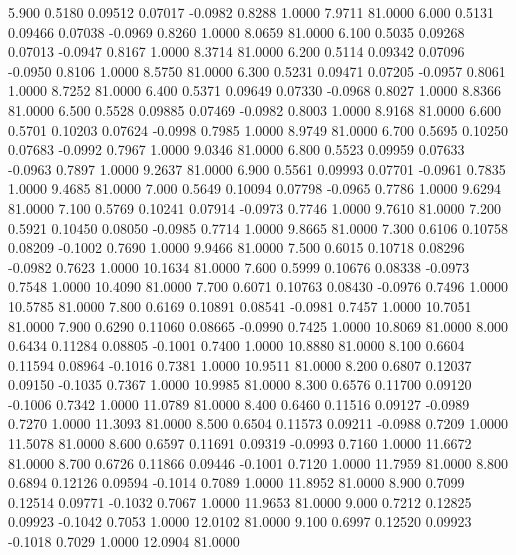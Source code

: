    5.900   0.5180   0.09512   0.07017  -0.0982   0.8288   1.0000   7.9711  81.0000
   6.000   0.5131   0.09466   0.07038  -0.0969   0.8260   1.0000   8.0659  81.0000
   6.100   0.5035   0.09268   0.07013  -0.0947   0.8167   1.0000   8.3714  81.0000
   6.200   0.5114   0.09342   0.07096  -0.0950   0.8106   1.0000   8.5750  81.0000
   6.300   0.5231   0.09471   0.07205  -0.0957   0.8061   1.0000   8.7252  81.0000
   6.400   0.5371   0.09649   0.07330  -0.0968   0.8027   1.0000   8.8366  81.0000
   6.500   0.5528   0.09885   0.07469  -0.0982   0.8003   1.0000   8.9168  81.0000
   6.600   0.5701   0.10203   0.07624  -0.0998   0.7985   1.0000   8.9749  81.0000
   6.700   0.5695   0.10250   0.07683  -0.0992   0.7967   1.0000   9.0346  81.0000
   6.800   0.5523   0.09959   0.07633  -0.0963   0.7897   1.0000   9.2637  81.0000
   6.900   0.5561   0.09993   0.07701  -0.0961   0.7835   1.0000   9.4685  81.0000
   7.000   0.5649   0.10094   0.07798  -0.0965   0.7786   1.0000   9.6294  81.0000
   7.100   0.5769   0.10241   0.07914  -0.0973   0.7746   1.0000   9.7610  81.0000
   7.200   0.5921   0.10450   0.08050  -0.0985   0.7714   1.0000   9.8665  81.0000
   7.300   0.6106   0.10758   0.08209  -0.1002   0.7690   1.0000   9.9466  81.0000
   7.500   0.6015   0.10718   0.08296  -0.0982   0.7623   1.0000  10.1634  81.0000
   7.600   0.5999   0.10676   0.08338  -0.0973   0.7548   1.0000  10.4090  81.0000
   7.700   0.6071   0.10763   0.08430  -0.0976   0.7496   1.0000  10.5785  81.0000
   7.800   0.6169   0.10891   0.08541  -0.0981   0.7457   1.0000  10.7051  81.0000
   7.900   0.6290   0.11060   0.08665  -0.0990   0.7425   1.0000  10.8069  81.0000
   8.000   0.6434   0.11284   0.08805  -0.1001   0.7400   1.0000  10.8880  81.0000
   8.100   0.6604   0.11594   0.08964  -0.1016   0.7381   1.0000  10.9511  81.0000
   8.200   0.6807   0.12037   0.09150  -0.1035   0.7367   1.0000  10.9985  81.0000
   8.300   0.6576   0.11700   0.09120  -0.1006   0.7342   1.0000  11.0789  81.0000
   8.400   0.6460   0.11516   0.09127  -0.0989   0.7270   1.0000  11.3093  81.0000
   8.500   0.6504   0.11573   0.09211  -0.0988   0.7209   1.0000  11.5078  81.0000
   8.600   0.6597   0.11691   0.09319  -0.0993   0.7160   1.0000  11.6672  81.0000
   8.700   0.6726   0.11866   0.09446  -0.1001   0.7120   1.0000  11.7959  81.0000
   8.800   0.6894   0.12126   0.09594  -0.1014   0.7089   1.0000  11.8952  81.0000
   8.900   0.7099   0.12514   0.09771  -0.1032   0.7067   1.0000  11.9653  81.0000
   9.000   0.7212   0.12825   0.09923  -0.1042   0.7053   1.0000  12.0102  81.0000
   9.100   0.6997   0.12520   0.09923  -0.1018   0.7029   1.0000  12.0904  81.0000
